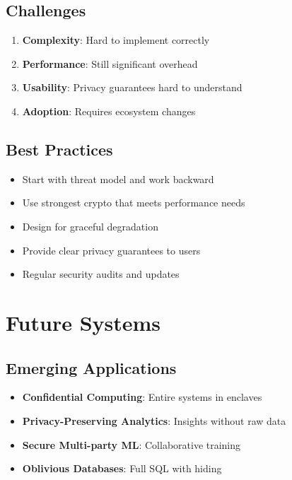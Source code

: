 \documentclass[11pt,final]{article}
\begin{document}
\subsection{Challenges}

\begin{enumerate}
    \item \textbf{Complexity}: Hard to implement correctly
    \item \textbf{Performance}: Still significant overhead
    \item \textbf{Usability}: Privacy guarantees hard to understand
    \item \textbf{Adoption}: Requires ecosystem changes
\end{enumerate}

\subsection{Best Practices}

\begin{itemize}
    \item Start with threat model and work backward
    \item Use strongest crypto that meets performance needs
    \item Design for graceful degradation
    \item Provide clear privacy guarantees to users
    \item Regular security audits and updates
\end{itemize}

\section{Future Systems}

\subsection{Emerging Applications}

\begin{itemize}
    \item \textbf{Confidential Computing}: Entire systems in enclaves
    \item \textbf{Privacy-Preserving Analytics}: Insights without raw data
    \item \textbf{Secure Multi-party ML}: Collaborative training
    \item \textbf{Oblivious Databases}: Full SQL with hiding
\end{itemize}
\end{document}
